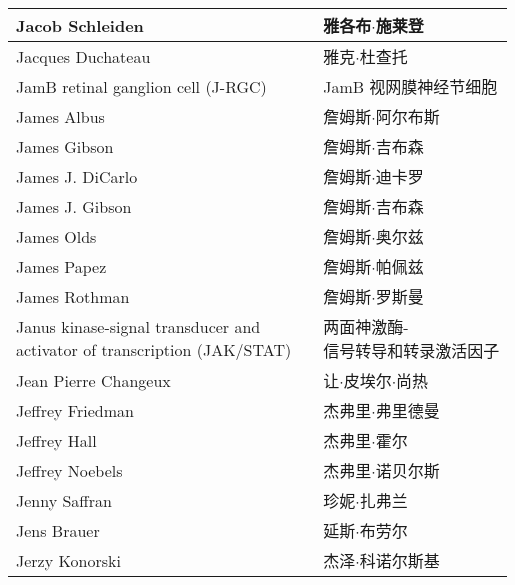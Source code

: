 \begin{longtable}{lll}
	\midrule
	Jacob Schleiden   && 雅各布$\cdot$施莱登  \\
	
	\midrule
	Jacques Duchateau   && 雅克$\cdot$杜查托  \\
	
	\midrule
	JamB retinal ganglion cell (J-RGC)   && JamB 视网膜神经节细胞  \\
	
	\midrule
	James Albus   && 詹姆斯$\cdot$阿尔布斯  \\
	
	\midrule
	James Gibson   && 詹姆斯$\cdot$吉布森  \\
	
	\midrule
	James J. DiCarlo   && 詹姆斯$\cdot$迪卡罗  \\
	
	\midrule
	James J. Gibson   && 詹姆斯$\cdot$吉布森  \\
	
	\midrule
	James Olds   && 詹姆斯$\cdot$奥尔兹  \\
	
	\midrule
	James Papez   && 詹姆斯$\cdot$帕佩兹  \\
	
	\midrule
	James Rothman   && 詹姆斯$\cdot$罗斯曼  \\
	
	\midrule
	\makecell[l]{Janus kinase-signal transducer and \\activator of transcription (JAK/STAT)}  && \makecell[l]{两面神激酶-\\信号转导和转录激活因子}  \\
	
	\midrule
	Jean Pierre Changeux   && 让$\cdot$皮埃尔$\cdot$尚热  \\
	
	\midrule
	Jeffrey Friedman   && 杰弗里$\cdot$弗里德曼  \\
	
	\midrule
	Jeffrey Hall   && 杰弗里$\cdot$霍尔  \\
	
	\midrule
	Jeffrey Noebels   && 杰弗里$\cdot$诺贝尔斯  \\
	
	\midrule
	Jenny Saffran   && 珍妮$\cdot$扎弗兰  \\
	
	\midrule
	Jens Brauer   && 延斯$\cdot$布劳尔  \\
	
	\midrule
	Jerzy Konorski   && 杰泽$\cdot$科诺尔斯基  \\
	

\end{longtable}

